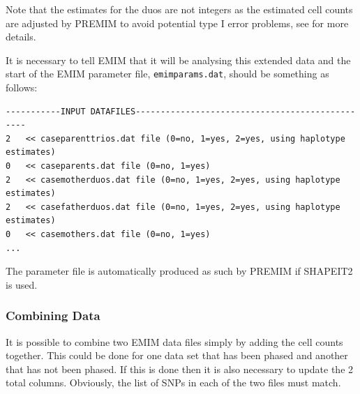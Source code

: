 \documentclass[a4paper,12pt]{article}
\newcommand{\code}[1]{{\footnotesize{{\tt #1}}}}
\begin{document}
Note that the estimates for the duos are not integers as the estimated cell counts are adjusted by PREMIM to avoid potential type I error problems, see \citet{howey:etal:15} for more details. 

It is necessary to tell EMIM that it will be analysing this extended data and the start of the EMIM parameter file, \code{emimparams.dat}, should be something as follows: 
\vspace{0.35cm} \begin{lstlisting}
-----------INPUT DATAFILES------------------------------------------------
2   << caseparenttrios.dat file (0=no, 1=yes, 2=yes, using haplotype estimates)
0   << caseparents.dat file (0=no, 1=yes)
2   << casemotherduos.dat file (0=no, 1=yes, 2=yes, using haplotype estimates)
2   << casefatherduos.dat file (0=no, 1=yes, 2=yes, using haplotype estimates)
0   << casemothers.dat file (0=no, 1=yes)
...

\end{lstlisting} \vspace{0.35cm}
The parameter file is automatically produced as such by PREMIM if SHAPEIT2 is used. 
\subsubsection{Combining Data}
\label{combining-data}

It is possible to combine two EMIM data files simply by adding the cell counts together. This could be done for one data set that has been phased and another that has not been phased. If this is done then it is also necessary to update the 2 total columns. Obviously, the list of SNPs in each of the two files must match. 
\end{document}

